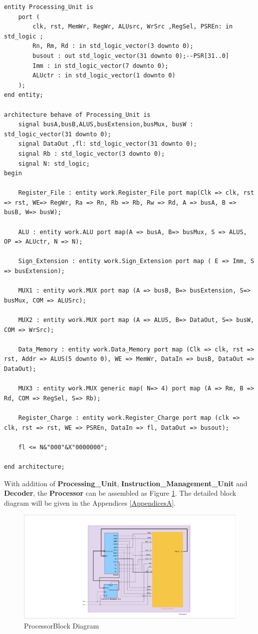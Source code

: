 \begin{lstlisting}[style=vhdl, breaklines]
entity Processing_Unit is 
    port (
        clk, rst, MemWr, RegWr, ALUsrc, WrSrc ,RegSel, PSREn: in  std_logic ; 
        Rn, Rm, Rd : in std_logic_vector(3 downto 0);
        busout : out std_logic_vector(31 downto 0);--PSR[31..0]
        Imm : in std_logic_vector(7 downto 0); 
        ALUctr : in std_logic_vector(1 downto 0)
    );
end entity;
  
architecture behave of Processing_Unit is
    signal busA,busB,ALUS,busExtension,busMux, busW : std_logic_vector(31 downto 0);
    signal DataOut ,fl: std_logic_vector(31 downto 0);
    signal Rb : std_logic_vector(3 downto 0); 
    signal N: std_logic;
begin
  
    Register_File : entity work.Register_File port map(Clk => clk, rst => rst, WE=> RegWr, Ra => Rn, Rb => Rb, Rw => Rd, A => busA, B => busB, W=> busW); 
  
    ALU : entity work.ALU port map(A => busA, B=> busMux, S => ALUS, OP => ALUctr, N => N); 
  
    Sign_Extension : entity work.Sign_Extension port map ( E => Imm, S => busExtension);
  
    MUX1 : entity work.MUX port map (A => busB, B=> busExtension, S=> busMux, COM => ALUSrc); 
  
    MUX2 : entity work.MUX port map (A => ALUS, B=> DataOut, S=> busW, COM => WrSrc);
  
    Data_Memory : entity work.Data_Memory port map (Clk => clk, rst => rst, Addr => ALUS(5 downto 0), WE => MemWr, DataIn => busB, DataOut => DataOut); 
  
    MUX3 : entity work.MUX generic map( N=> 4) port map (A => Rm, B => Rd, COM => RegSel, S=> Rb); 
  
    Register_Charge : entity work.Register_Charge port map (clk => clk, rst => rst, WE => PSREn, DataIn => fl, DataOut => busout); 
  
    fl <= N&"000"&X"0000000";
  
end architecture;
\end{lstlisting}

With addition of \textbf{Processing\_Unit}, \textbf{Instruction\_Management\_Unit} and 
\textbf{Decoder}, the \textbf{Processor} can be assembled as Figure \ref{fig:PUs}. The detailed block diagram
will be given in the Appendices \ref{AppendicesA}.
\begin{figure}[htp]
    \centering
    \includegraphics[width=1\textwidth]{picture/PUs.pdf}
    \caption{ProcessorBlock Diagram}     
    \label{fig:PUs}
\end{figure}

